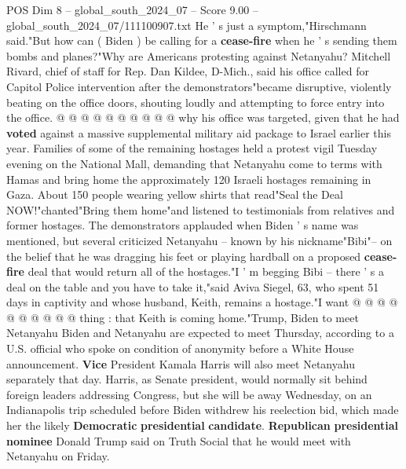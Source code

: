 \begin{textsample}{POS Dim 8 – global\_south\_2024\_07 – Score 9.00 – global\_south\_2024\_07/111100907.txt}
He ' s just a symptom,"Hirschmann said."But how can ( Biden ) be calling for a \textbf{cease-fire} when he ' s sending them bombs and planes?"Why are Americans protesting against Netanyahu?
Mitchell Rivard, chief of staff for Rep.
Dan Kildee, D-Mich., said his office called for Capitol Police intervention after the demonstrators"became disruptive, violently beating on the office doors, shouting loudly and attempting to force entry into the office. @ @ @ @ @ @ @ @ @ @ why his office was targeted, given that he had \textbf{voted} against a massive supplemental military aid package to Israel earlier this year.
Families of some of the remaining hostages held a protest vigil Tuesday evening on the National Mall, demanding that Netanyahu come to terms with Hamas and bring home the approximately 120 Israeli hostages remaining in Gaza.
About 150 people wearing yellow shirts that read"Seal the Deal NOW!"chanted"Bring them home"and listened to testimonials from relatives and former hostages.
The demonstrators applauded when Biden ' s name was mentioned, but several criticized Netanyahu -- known by his nickname"Bibi"-- on the belief that he was dragging his feet or playing hardball on a proposed \textbf{cease-fire} deal that would return all of the hostages."I ' m begging Bibi -- there ' s a deal on the table and you have to take it,"said Aviva Siegel, 63, who spent 51 days in captivity and whose husband, Keith, remains a hostage."I want @ @ @ @ @ @ @ @ @ @ thing : that Keith is coming home."Trump, Biden to meet Netanyahu Biden and Netanyahu are expected to meet Thursday, according to a U.S. official who spoke on condition of anonymity before a White House announcement. \textbf{Vice} President Kamala Harris will also meet Netanyahu separately that day.
Harris, as Senate president, would normally sit behind foreign leaders addressing Congress, but she will be away Wednesday, on an Indianapolis trip scheduled before Biden withdrew his reelection bid, which made her the likely \textbf{Democratic} \textbf{presidential} \textbf{candidate}. \textbf{Republican} \textbf{presidential} \textbf{nominee} Donald Trump said on Truth Social that he would meet with Netanyahu on Friday.

\end{textsample}
